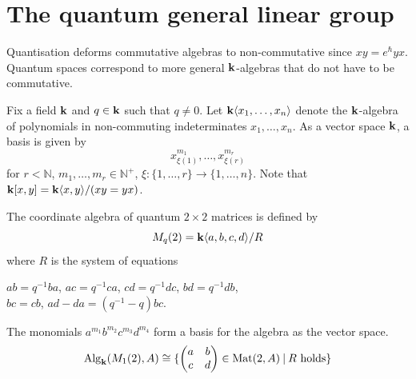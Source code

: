 \documentclass[8pt]{article}
\theoremstyle{definition}
\theoremstyle{definition}
\theoremstyle{definition}
\theoremstyle{definition}
\theoremstyle{definition}
\theoremstyle{definition}
\theoremstyle{definition}
\theoremstyle{definition}
\theoremstyle{definition}
\theoremstyle{definition}
\theoremstyle{definition}
\theoremstyle{definition}
\theoremstyle{definition}
\theoremstyle{definition}
\theoremstyle{question}
\begin{document}
\section{The quantum general linear group}

Quantisation deforms commutative algebras to non-commutative since 
$x y = e^{\hslash} y x$. Quantum spaces correspond to more general ${\bf k}$-algebras
that do not have to be commutative.

Fix a field ${\bf k}$ and $q \in {\bf k}$ such that $q \neq 0$. 
Let ${\bf k}\langle x_1, \ldots, x_n \rangle$ denote the ${\bf k}$-algebra of polynomials
in non-commuting indeterminates $x_1, \ldots, x_n$. As a vector space ${\bf k}$,
a basis is given by
\[
x^{m_1}_{\xi(1)}, \ldots, x^{m_r}_{\xi(r)}
\]
for $r < \mathbb{N}$, $m_1, \ldots, m_r \in \mathbb{N}^+$, 
$\xi : \{ 1, \ldots, r\} \to \{ 1, \ldots, n\}$. Note that
${\bf k}[x, y] = {\bf k}\langle x, y \rangle/(xy = yx)$.

The coordinate algebra of quantum $2 \times 2$ matrices is defined by
\[
M_q(2) = {\bf k}\langle a, b,c, d \rangle/R
\]
where $R$ is the system of equations
\begin{center}
  $a b = q^{-1} b a$, $a c = q^{-1} c a$, $c d = q^{-1} d c$, $b d = q^{-1} d b$, \\
  $b c = c b$, $a d - d a = (q^{-1} - q) b c$.
\end{center}

The monomials $a^{m_1} b^{m_2} c^{m_3} d^{m_4}$ form a basis for the algebra as the vector space.
\[
\operatorname{Alg}_{\bf k}(M_1(2), A) \cong \{ \begin{pmatrix} a & b\\ c & d \end{pmatrix} \in \operatorname{Mat}(2, A) \: | \: \text{$R$ holds} \}
\]
\end{document}
